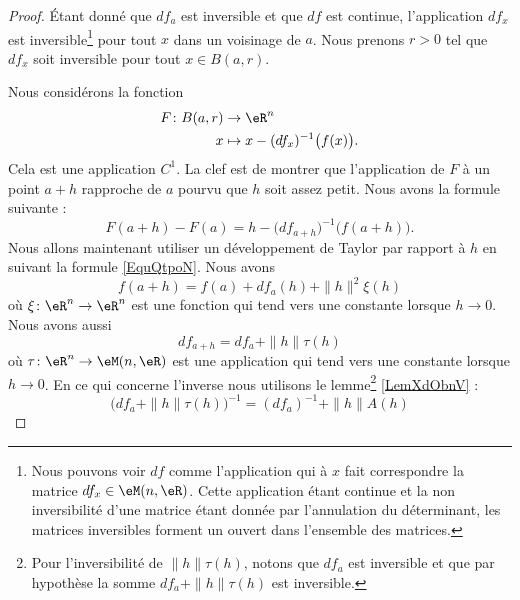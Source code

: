 \begin{proof}
    Étant donné que \( df_a\) est inversible et que \( df\) est continue, l'application \( df_x\) est inversible\footnote{Nous pouvons voir \( df\) comme l'application qui à \( x\) fait correspondre la matrice \( df_x\in\eM(n,\eR)\). Cette application étant continue et la non inversibilité d'une matrice étant donnée par l'annulation du déterminant, les matrices inversibles forment un ouvert dans l'ensemble des matrices.} pour tout \( x\) dans un voisinage de \( a\). Nous prenons \( r>0\) tel que \( df_x\) soit inversible pour tout \( x\in B(a,r)\).

    Nous considérons la fonction 
    \begin{equation}
        \begin{aligned}
                F\colon B(a,r)&\to \eR^n \\
                x&\mapsto x-(df_x)^{-1}\big( f(x) \big). 
            \end{aligned}
        \end{equation}
        Cela est une application \( C^1\). La clef est de montrer que l'application de \( F\) à un point \( a+h\) rapproche de \( a\) pourvu que \( h\) soit assez petit. Nous avons la formule suivante :
        \begin{equation}        \label{EqyDLQeE}
            F(a+h)-F(a)=h-\big( df_{a+h} \big)^{-1}\big( f(a+h) \big).
        \end{equation}
        Nous allons maintenant utiliser un développement de Taylor par rapport à \( h\) en suivant la formule \eqref{EquQtpoN}. Nous avons
        \begin{equation}
            f(a+h)=f(a)+df_a(h)+\| h \|^2\xi(h)
        \end{equation}
        où \( \xi\colon \eR^n\to \eR^n\) est une fonction qui tend vers une constante lorsque \( h\to 0\). Nous avons aussi
        \begin{equation}
            df_{a+h}=df_a+\| h \|\tau(h)
        \end{equation}
        où \( \tau\colon \eR^n\to \eM(n,\eR)\) est une application qui tend vers une constante lorsque \( h\to 0\). En ce qui concerne l'inverse nous utilisons le lemme\footnote{Pour l'inversibilité de \( \| h \|\tau(h)\), notons que \( df_a\) est inversible et que par hypothèse la somme \( df_a+\| h \|\tau(h)\) est inversible.} \ref{LemXdObnV} :
        \begin{equation}
            \big( df_a+\| h \|\tau(h) \big)^{-1}=(df_a)^{-1}+\| h \|A(h)

\end{equation}
\end{proof}
